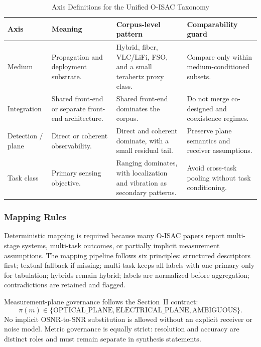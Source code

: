 \begin{table}[!t]
\caption{Axis Definitions for the Unified O-ISAC Taxonomy}
\label{tab:taxonomy-axes}
\centering
\footnotesize
\setlength{\tabcolsep}{4pt}
\begin{tabularx}{\textwidth}{p{}p{}p{}X}
\toprule
\textbf{Axis} & \textbf{Meaning} & \textbf{Corpus-level pattern} & \textbf{Comparability guard} \\
\midrule
Medium & Propagation and deployment substrate. & Hybrid, fiber, VLC/LiFi, FSO, and a small terahertz proxy class. & Compare only within medium-conditioned subsets. \\
Integration & Shared front-end or separate front-end architecture. & Shared front-end dominates the corpus. & Do not merge co-designed and coexistence regimes. \\
Detection / plane & Direct or coherent observability. & Direct and coherent dominate, with a small residual tail. & Preserve plane semantics and receiver assumptions. \\
Task class & Primary sensing objective. & Ranging dominates, with localization and vibration as secondary patterns. & Avoid cross-task pooling without task conditioning. \\
\bottomrule
\end{tabularx}
\end{table}

\subsubsection{Mapping Rules}
Deterministic mapping is required because many O-ISAC papers report multi-stage systems, multi-task outcomes, or partially implicit measurement assumptions. The mapping pipeline follows six principles: structured descriptors first; textual fallback if missing; multi-task keeps all labels with one primary only for tabulation; hybrids remain hybrid; labels are normalized before aggregation; contradictions are retained and flagged.

Measurement-plane governance follows the Section~II contract:
\[
\pi(m) \in \{\text{OPTICAL\_PLANE}, \text{ELECTRICAL\_PLANE}, \text{AMBIGUOUS}\}.
\]
No implicit OSNR-to-SNR substitution is allowed without an explicit receiver or noise model. Metric governance is equally strict: resolution and accuracy are distinct roles and must remain separate in synthesis statements.

